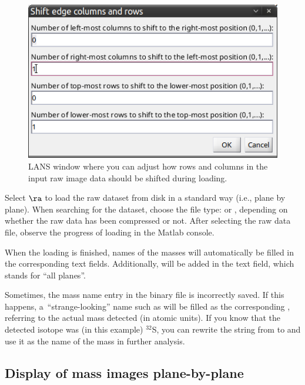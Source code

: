 \begin{figure}[!ht]
\centering
\includegraphics[scale=0.5]{figs1/LANS-shift-rows-columns}
\caption{\label{fig:shiftrowcolumn}%
LANS window where you can adjust how rows and columns in the input raw image data should be shifted during loading.}
\end{figure}

\s Select  $\ra$  to load the raw dataset from disk in a standard way (i.e., plane by plane). When searching for the dataset, choose the file type:  or , depending on whether the raw data has been compressed or not. After selecting the raw data file, observe the progress of loading in the Matlab console. 

\nb
\bul When the loading is finished, names of the masses will automatically be filled in the corresponding  text fields. Additionally, \ttt{[]} will be added in the  text field, which stands for ``all planes''.

\bul Sometimes, the mass name entry in the binary  file is incorrectly saved. If this happens, a~``strange-looking'' name such as  will be filled as the corresponding , referring to the actual mass detected (in atomic units). If you know that the detected isotope was (in this example) ${}^{32}$S, you can rewrite the string from  to  and use it as the name of the mass in further analysis.


\subsection{Display of mass images plane-by-plane}
\setcounter{step}{0}
\label{sec:display-masses-plane-by-plane}

